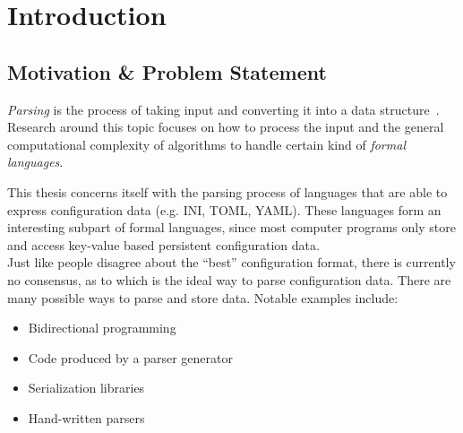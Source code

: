 \documentclass[draft, oneside, final]{vutinfth}
\begin{document}
\frontmatter

\addstatementpage


\tableofcontents

\mainmatter

\chapter{Introduction}

\section{Motivation \& Problem Statement}
\label{sec:Motivation}

\begin{sloppypar}
\emph{Parsing} is the process of taking input and converting it into a data structure~\cite{wikipedia2016Parser, grune2007parsing}. Research around this topic focuses on how to process the input and the general computational complexity of algorithms to handle certain kind of \emph{formal languages}.\\
\end{sloppypar}

This thesis concerns itself with the parsing process of languages that are able to express configuration data (e.g. INI, TOML, YAML). These languages form an interesting subpart of formal languages, since most computer programs only store and access key-value based persistent configuration data.\\

Just like people disagree about the “best” configuration format, there is currently no consensus, as to which is the ideal way to parse configuration data. There are many possible ways to parse and store data. Notable examples include:

\begin{itemize}
  \item Bidirectional programming~\cite{foster2005combinators, bohannon2006relational, lutterkort2008augeas, ko2016bigul, raab2016improving}
  \item Code produced by a parser generator~\cite{denny2008ielr, parr2014adaptive, warth2016modular, bates2017aprt}
  \item Serialization libraries~\cite{sumaray2012cds, pacini2015performance}
  \item Hand-written parsers~\cite{myers2008cparser, bendersky2012clang}
\end{itemize}
\end{document}
